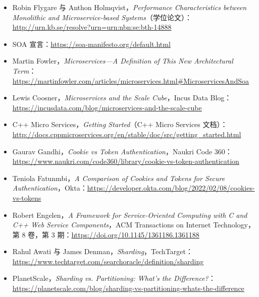 \begin{itemize}
\item Robin Flygare 与 Anthon Holmqvist，\emph{Performance Characteristics between Monolithic and Microservice-based Systems}（学位论文）：\href{https://bth.diva-portal.org/smash/record.jsf?pid=diva2\%3A1119785&dswid=-7832}{http://urn.kb.se/resolve?urn=urn:nbn:se:bth-14888}
\item SOA 宣言：\href{https://soa-manifesto.org/default.html}{https://soa-manifesto.org/default.html}
\item Martin Fowler，\emph{Microservices—A Definition of This New Architectural Term}：\href{https://martinfowler.com/articles/microservices.html\#MicroservicesAndSoa }{https://martinfowler.com/articles/microservices.html\#MicroservicesAndSoa}
\item Lewis Coosner，\emph{Microservices and the Scale Cube}，Incus Data Blog：\href{https://incusdata.com/blog/microservices-and-the-scale-cube}{https://incusdata.com/blog/microservices-and-the-scale-cube}
\item C++ Micro Services，\emph{Getting Started}（C++ Micro Services 文档）：\href{http://docs.cppmicroservices.org/en/stable/doc/src/getting_started.html}{http://docs.cppmicroservices.org/en/stable/doc/src/getting\_started.html}
\item Gaurav Gandhi，\emph{Cookie vs Token Authentication}，Naukri Code 360：\href{https://www.naukri.com/code360/library/cookie-vs-token-authentication}{https://www.naukri.com/code360/library/cookie-vs-token-authentication}
\item Teniola Fatunmbi，\emph{A Comparison of Cookies and Tokens for Secure Authentication}，Okta：\href{https://developer.okta.com/blog/2022/02/08/cookies-vs-tokens}{https://developer.okta.com/blog/2022/02/08/cookies-vs-tokens}
\item Robert Engelen，\emph{A Framework for Service-Oriented Computing with C and C++ Web Service Components}，ACM Transactions on Internet Technology，第 8 卷，第 3 期：\href{https://dl.acm.org/doi/10.1145/1361186.1361188}{https://doi.org/10.1145/1361186.1361188}
\item Rahul Awati 与 James Denman，\emph{Sharding}，TechTarget：\href{https://www.techtarget.com/searchoracle/definition/sharding}{https://www.techtarget.com/searchoracle/definition/sharding}
\item PlanetScale，\emph{Sharding vs. Partitioning: What’s the Difference?}：\href{https://planetscale.com/blog/sharding-vs-partitioning-whats-the-difference}{https://planetscale.com/blog/sharding-vs-partitioning-whats-the-difference}

\end{itemize}
